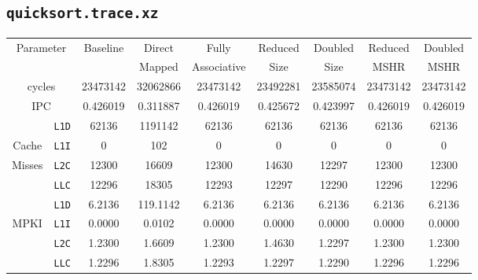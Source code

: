 \documentclass[11pt, swedish, openany]{book}
\begin{document}
\subsection{\texttt{quicksort.trace.xz}}
\begin{table}[H]
    \begin{tabular}{||c|c||c||c|c||c|c||c|c||}
        \hline
        \multicolumn{2}{||c||}{\multirow{2}{*}{Parameter}} & \multirow{2}{*}{Baseline} & Direct   & Fully       & Reduced  & Doubled  & Reduced  & Doubled  \\
        \multicolumn{2}{||c||}{}                           &                           & Mapped   & Associative & Size     & Size     & MSHR     & MSHR     \\
        \hline
        \multicolumn{2}{||c||}{cycles}                     & 23473142                  & 32062866 & 23473142    & 23492281 & 23585074 & 23473142 & 23473142 \\
        \multicolumn{2}{||c||}{IPC}                        & 0.426019                  & 0.311887 & 0.426019    & 0.425672 & 0.423997 & 0.426019 & 0.426019 \\
        \hline
                                            & \texttt{L1D} & 62136                     & 1191142  & 62136       & 62136    & 62136    & 62136    & 62136    \\
        Cache                               & \texttt{L1I} & 0                         & 102      & 0           & 0        & 0        & 0        & 0        \\
        Misses                              & \texttt{L2C} & 12300                     & 16609    & 12300       & 14630    & 12297    & 12300    & 12300    \\
                                            & \texttt{LLC} & 12296                     & 18305    & 12293       & 12297    & 12290    & 12296    & 12296    \\
        \hline
                                            & \texttt{L1D} & 6.2136                    & 119.1142 & 6.2136      & 6.2136   & 6.2136   & 6.2136   & 6.2136   \\
        \multirow{2}{*}{MPKI}               & \texttt{L1I} & 0.0000                    & 0.0102   & 0.0000      & 0.0000   & 0.0000   & 0.0000   & 0.0000   \\
                                            & \texttt{L2C} & 1.2300                    & 1.6609   & 1.2300      & 1.4630   & 1.2297   & 1.2300   & 1.2300   \\
                                            & \texttt{LLC} & 1.2296                    & 1.8305   & 1.2293      & 1.2297   & 1.2290   & 1.2296   & 1.2296   \\

\end{tabular}
\end{table}
\end{document}

